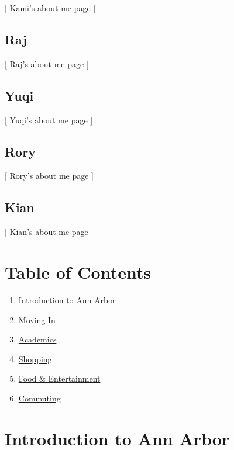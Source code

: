\documentclass[
]{book}
\providecommand{\tightlist}{%
  \setlength{\itemsep}{0pt}\setlength{\parskip}{0pt}}
\begin{document}
{[} Kami's about me page {]}

\hypertarget{raj}{%
\section{Raj}\label{raj}}

{[} Raj's about me page {]}

\hypertarget{yuqi}{%
\section{Yuqi}\label{yuqi}}

{[} Yuqi's about me page {]}

\hypertarget{rory}{%
\section{Rory}\label{rory}}

{[} Rory's about me page {]}

\hypertarget{kian}{%
\section{Kian}\label{kian}}

{[} Kian's about me page {]}

\hypertarget{table-of-contents}{%
\chapter*{Table of Contents}\label{table-of-contents}}

\begin{enumerate}
\def\labelenumi{\arabic{enumi}.}
\tightlist
\item
  \protect\hyperlink{introduction}{Introduction to Ann Arbor}
\item
  \protect\hyperlink{move-in}{Moving In}
\item
  \protect\hyperlink{academics}{Academics}
\item
  \protect\hyperlink{shopping}{Shopping}
\item
  \protect\hyperlink{food-entertainment}{Food \& Entertainment}
\item
  \protect\hyperlink{commuting}{Commuting}
\end{enumerate}

\hypertarget{introduction-to-ann-arbor}{%
\chapter{Introduction to Ann Arbor}\label{introduction-to-ann-arbor}}
\end{document}
